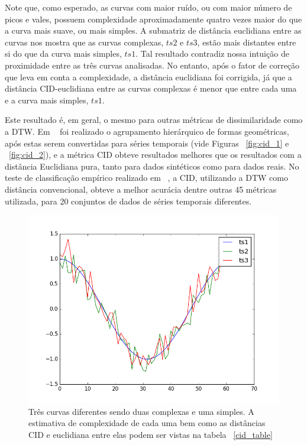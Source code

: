 Note que, como esperado, as curvas com maior ruído, ou com maior número de picos e vales, possuem complexidade aproximadamente quatro vezes maior do que a curva mais suave, ou mais simples. A submatriz de distância euclidiana entre as curvas nos mostra que as curvas complexas, $ts2$ e $ts3$, estão mais distantes entre si do que da curva mais simples, $ts1$. Tal resultado contradiz nossa intuição de proximidade entre as três curvas analisadas. No entanto, após o fator de correção que leva em conta a complexidade, a distância euclidiana foi corrigida, já que a distância CID-euclidiana entre as curvas complexas é menor que entre cada uma e a curva mais simples, $ts1$.

Este resultado é, em geral, o mesmo para outras métricas de dissimilaridade como a DTW. Em ~\parencite{CID} foi realizado o agrupamento hierárquico de formas geométricas, após estas serem convertidas para séries temporais (vide Figuras ~\ref{fig:cid_1} e ~\ref{fig:cid_2}), e a métrica CID obteve resultados melhores que os resultados com a distância Euclidiana pura, tanto para dados sintéticos como para dados reais. No teste de classificação empírico realizado em ~\parencite{BatistaComparativo}, a CID, utilizando a DTW como distância convencional, obteve a melhor acurácia dentre outras 45 métricas utilizada, para 20 conjuntos de dados de séries temporais diferentes.

\begin{figure}[h!]
	\includegraphics[width=\linewidth]{figuras/CID.png}
	\caption{Três curvas diferentes sendo duas complexas e uma simples. A estimativa de complexidade de cada uma bem como as distâncias CID e euclidiana entre elas podem ser vistas na tabela ~\ref{cid_table}}
	\label{fig:cid}
\end{figure}

